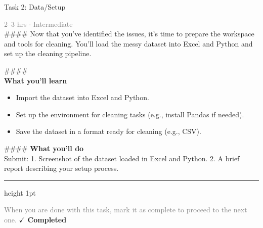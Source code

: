 \documentclass[10pt,a4paper]{article}
\begin{document}
\begin{taskbox}{Task 2: Data/Setup}

    {\small \textcolor{gray}{2--3 hrs $\cdot$ Intermediate}}\\[12pt]

    \#\#\#\#   
Now that you’ve identified the issues, it’s time to prepare the workspace and tools for cleaning. You'll load the messy dataset into Excel and Python and set up the cleaning pipeline.

\#\#\#\# \\[10pt]
\vspace{8pt}
{\large \textbf{\textcolor{brandLight}{What you'll learn}}}\\[4pt]  
\begin{itemize}
    \item Import the dataset into Excel and Python.  
    \item Set up the environment for cleaning tasks (e.g., install Pandas if needed).  
    \item Save the dataset in a format ready for cleaning (e.g., CSV).  
\end{itemize}

\#\#\#\# \vspace{8pt}
{\large \textbf{\textcolor{brandLight}{What you'll do}}}\\[4pt]  
Submit:  
1. Screenshot of the dataset loaded in Excel and Python.  
2. A brief report describing your setup process.\par

    \vspace{16pt}

    \textcolor{cardBorder}{\hrule height 1pt}\vspace{8pt}

    \small \textcolor{gray}{When you are done with this task, mark it as complete to proceed to the next one.} \hfill \textbf{\textcolor{brandDark}{$\checkmark$ Completed}}

\end{taskbox}
\end{document}
